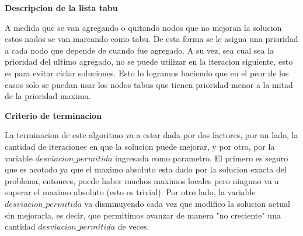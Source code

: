 \textbf{Descripcion de la lista tabu} \newline

 A medida que se van agregando o quitando nodos que no mejoran la solucion estos nodos se van marcando como tabu. De esta forma se le asigna una prioridad a cada nodo que depende de cuando fue agregado. A su vez, sea cual sea la prioridad del ultimo agregado, no se puede utilizar en la iteracion siguiente, esto es para evitar ciclar soluciones. Esto lo logramos haciendo que en el peor de los casos solo se puedan usar los nodos tabus que tienen prioridad menor a la mitad de la prioridad maxima. \newline

\textbf{Criterio de terminacion} \newline

 La terminacion de este algoritmo va a estar dada por dos factores, por un lado, la cantidad de iteraciones en que la solucion puede mejorar, y por otro, por la variable $desviacion\_permitida$ ingresada como parametro. El primero es seguro que es acotado ya que el maximo absoluto esta dado por la solucion exacta del problema, entonces, puede haber muchos maximos locales pero ninguno va a superar el maximo absoluto (esto es trivial). Por otro lado, la variable $desviacion\_permitida$ va disminuyendo cada vez que modifico la solucion actual sin mejorarla, es decir, que permitimos avanzar de manera "no creciente" una cantidad $desviacion\_permitida$ de veces. \newline


